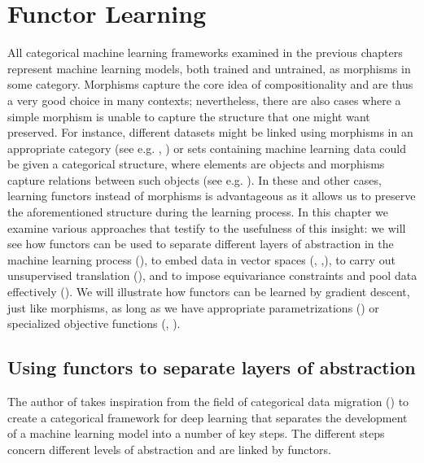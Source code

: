 \documentclass[11pt,a4paper,openright,twoside]{report}
\theoremstyle{plain}
\theoremstyle{definition}
\begin{document}
\chapter{Functor Learning}


\lhead[\fancyplain{}{\bfseries\thepage}]{\fancyplain{}{\bfseries\rightmark}}



All categorical machine learning frameworks examined in the previous chapters represent machine learning models, both trained and untrained, as morphisms in some category. Morphisms capture the core idea of compositionality and are thus a very good choice in many contexts; nevertheless, there are also cases where a simple morphism is unable to capture the structure that one might want preserved. For instance, different datasets might be linked using morphisms in an appropriate category (see e.g. \cite{spivak2012functorial}, \cite{gavranovic2019compositional}) or sets containing machine learning data could be given a categorical structure, where elements are objects and morphisms capture relations between such objects (see e.g. \cite{lambek1999type}). In these and other cases, learning functors instead of morphisms is advantageous as it allows us to preserve the aforementioned structure during the learning process. In this chapter we examine various approaches that testify to the usefulness of this insight: we will see how functors can be used to separate different layers of abstraction in the machine learning process (\cite{gavranovic2019compositional}), to embed data in vector spaces (\cite{sheshmani2021categorical}, \cite{coecke2010mathematical},\cite{lewis2019compositionality}), to carry out unsupervised translation (\cite{sheshmani2021categorical}), and to impose equivariance constraints and pool data effectively (\cite{chytas2024poolingimagedatasetsmultiple}).
We will illustrate how functors can be learned by gradient descent, just like morphisms, as long as we have appropriate parametrizations (\cite{gavranovic2019compositional}) or specialized objective functions (\cite{sheshmani2021categorical}, \cite{chytas2024poolingimagedatasetsmultiple}). 


\section{Using functors to separate layers of abstraction}

The author of \cite{gavranovic2019compositional} takes inspiration from the field of categorical data migration (\cite{spivak2012functorial}) to create a categorical framework for deep learning that separates the development of a machine learning model into a number of key steps. The different steps concern different levels of abstraction and are linked by functors.
\end{document}
